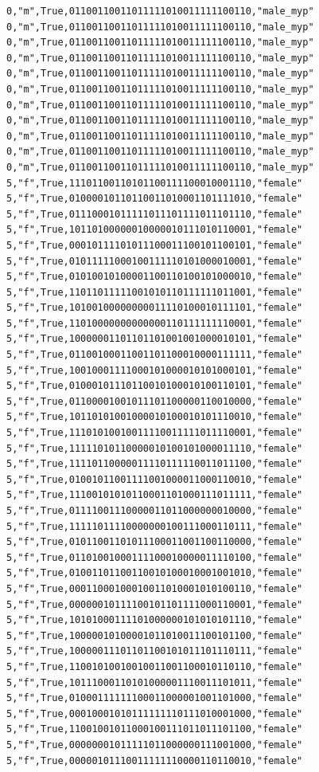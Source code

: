 \documentclass[authoryearcitations]{UoYCSproject}
\begin{document}
\begin{framed}
\begin{verbatim}
0,"m",True,01100110011011111010011111100110,"male_myp"
0,"m",True,01100110011011111010011111100110,"male_myp"
0,"m",True,01100110011011111010011111100110,"male_myp"
0,"m",True,01100110011011111010011111100110,"male_myp"
0,"m",True,01100110011011111010011111100110,"male_myp"
0,"m",True,01100110011011111010011111100110,"male_myp"
0,"m",True,01100110011011111010011111100110,"male_myp"
0,"m",True,01100110011011111010011111100110,"male_myp"
0,"m",True,01100110011011111010011111100110,"male_myp"
0,"m",True,01100110011011111010011111100110,"male_myp"
0,"m",True,01100110011011111010011111100110,"male_myp"
5,"f",True,11101100110101100111100010001110,"female"
5,"f",True,01000010110110011010001101111010,"female"
5,"f",True,01110001011111011101111011101110,"female"
5,"f",True,10110100000010000010111010110001,"female"
5,"f",True,00010111101011100011100101100101,"female"
5,"f",True,01011111000100111110101000010001,"female"
5,"f",True,01010010100001100110100101000010,"female"
5,"f",True,11011011111001010110111111011001,"female"
5,"f",True,10100100000000011110100010111101,"female"
5,"f",True,11010000000000000110111111110001,"female"
5,"f",True,10000001101101101001001000010101,"female"
5,"f",True,01100100011001101100010000111111,"female"
5,"f",True,10010001111000101000010101000101,"female"
5,"f",True,01000101110110010100010100110101,"female"
5,"f",True,01100001001011101100000110010000,"female"
5,"f",True,10110101001000010100010101110010,"female"
5,"f",True,11101010010011110011111011110001,"female"
5,"f",True,11111010110000010100101000011110,"female"
5,"f",True,11110110000011110111110011011100,"female"
5,"f",True,01001011001111001000011000110010,"female"
5,"f",True,11100101010110001101000111011111,"female"
5,"f",True,01111001110000011011000000010000,"female"
5,"f",True,11111011110000000100111000110111,"female"
5,"f",True,01011001101011100011001100110000,"female"
5,"f",True,01101001000111100010000011110100,"female"
5,"f",True,01001101100110010100010001001010,"female"
5,"f",True,00011000100010011010001010100110,"female"
5,"f",True,00000010111100101101111000110001,"female"
5,"f",True,10101000111101000000101010101110,"female"
5,"f",True,10000010100001011010011100101100,"female"
5,"f",True,10000011101101100101011101110111,"female"
5,"f",True,11001010010010011001100010110110,"female"
5,"f",True,10111000110101000001110011101011,"female"
5,"f",True,01000111111100011000001001101000,"female"
5,"f",True,00010001010111111110111010001000,"female"
5,"f",True,11001001011000100111011011101100,"female"
5,"f",True,00000001011111011000000111001000,"female"
5,"f",True,00000101110011111110000110110010,"female"

\end{verbatim}
\end{framed}
\end{document}
